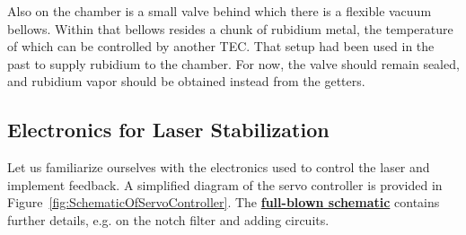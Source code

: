 \documentclass{../lab}
\begin{document}
\begin{itemize}
    Also on the chamber is a small valve behind which there is a flexible vacuum bellows.  Within that bellows resides a chunk of rubidium metal, the temperature of which can be controlled by another TEC.  That setup had been used in the past to supply rubidium to the chamber.  For now, the valve should remain sealed, and rubidium vapor should be obtained instead from the getters.
    
    



    
\end{itemize}

\subsection{Electronics for Laser Stabilization}

Let us familiarize ourselves with the electronics used to control the laser and implement feedback. A simplified diagram of the servo controller is provided in Figure~\ref{fig:SchematicOfServoController}. The \href{https://berkeley-physics111b.github.io/assets/pdf/oldwebsitestructure/images/Full\_schematic.pdf}{\textbf{full-blown schematic}} contains further details, e.g. on the notch filter and adding circuits.
\end{document}
